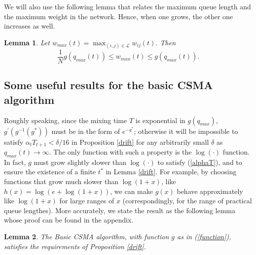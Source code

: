 \documentclass[10pt,onecolumn,draftclsnofoot,journal]{IEEEtran}
\newtheorem{lemma}{Lemma}
\begin{document}
We will also use the following lemma that relates the maximum queue length and the maximum weight in the network. Hence, when one grows, the other one increases as well.
\begin{lemma} \label{relate}
Let $w_{max}(t)=\max_{(i,j) \in \mathcal{L}} w_{ij}(t)$. Then
$$
\frac{1}{N}g\left(q_{max}(t)\right) \leq w_{max}(t) \leq g\left(q_{max}(t)\right).
$$
\end{lemma}
\subsection*{Some useful results for the basic CSMA algorithm}
Roughly speaking, since the mixing time $T$ is exponential in $g(q_{max})$, $g^\prime(g^{-1}(g^*))$ must be in the form of $e^{-{g^*}}$;
otherwise it will be impossible to satisfy $\alpha_tT_{t+1}< \delta/16$ in Proposition \ref{drift} for any arbitrarily small $\delta$ as $q_{max}(t) \to \infty$.
The only function with such a property is the $\log(\cdot)$ function. In fact, $g$ must grow slightly slower than $\log(\cdot)$ to satisfy (\ref{alphaT}), and to ensure the existence of a finite $t^*$ in Lemma \ref{drift}. For example, by choosing functions that grow much slower than $\log(1+x)$, like $h(x)=\log(e+\log(1+x))$, we can make $g(x)$ behave approximately like $\log(1+x)$ for large ranges of $x$ (correspondingly, for the range of practical queue lengthes). More accurately, we state the result as the following lemma whose proof can be found in the appendix.
\begin{lemma}\label{lemma: adiabatic}
The Basic CSMA algorithm, with function $g$ as in (\ref{function}), satisfies the requirements of Proposition \ref{drift}.
\end{lemma}
\end{document}
